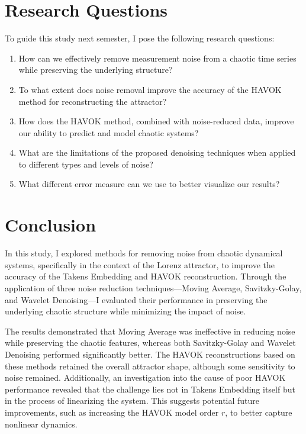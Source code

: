 \documentclass[11pt]{article}
\begin{document}
	
	\section{Research Questions}
	To guide this study next semester, I pose the following research questions:
	\begin{enumerate}
		\item How can we effectively remove measurement noise from a chaotic time series while preserving the underlying structure?
		\item To what extent does noise removal improve the accuracy of the HAVOK method for reconstructing the attractor?
		\item How does the HAVOK method, combined with noise-reduced data, improve our ability to predict and model chaotic systems?
		\item What are the limitations of the proposed denoising techniques when applied to different types and levels of noise?
		\item What different error measure can we use to better visualize our results?
	\end{enumerate}
	
	\section{Conclusion}
	In this study, I explored methods for removing noise from chaotic dynamical systems, specifically in the context of the Lorenz attractor, to improve the accuracy of the Takens Embedding and HAVOK reconstruction. Through the application of three noise reduction techniques—Moving Average, Savitzky-Golay, and Wavelet Denoising—I evaluated their performance in preserving the underlying chaotic structure while minimizing the impact of noise.
	
	The results demonstrated that Moving Average was ineffective in reducing noise while preserving the chaotic features, whereas both Savitzky-Golay and Wavelet Denoising performed significantly better. The HAVOK reconstructions based on these methods retained the overall attractor shape, although some sensitivity to noise remained. Additionally, an investigation into the cause of poor HAVOK performance revealed that the challenge lies not in Takens Embedding itself but in the process of linearizing the system. This suggests potential future improvements, such as increasing the HAVOK model order \(r\), to better capture nonlinear dynamics.
	
\end{document}
